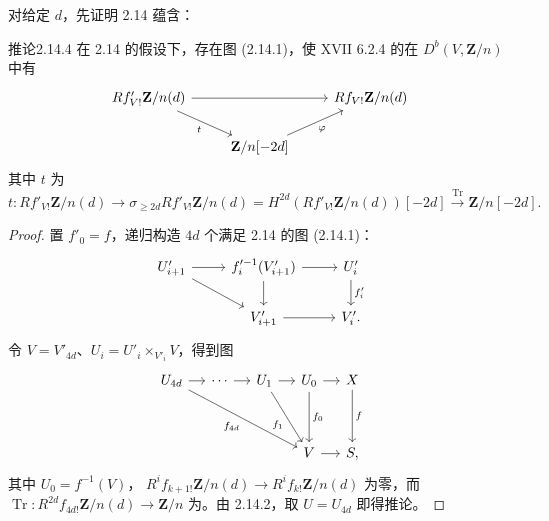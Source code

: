 对给定 $d$，先证明 2.14 蕴含：
\begin{SGAresult}{推论}{2.14.4}
在 2.14 的假设下，存在图 (2.14.1)，使 XVII 6.2.4 的在 $D^b(V,\mathbf Z/n)$ 中有
\[\begin{tikzcd}Rf'_{V!}\mathbf Z/n(d)\arrow[rr]\arrow[dr,"t"']&&Rf_{V!}\mathbf Z/n(d)\\&\mathbf Z/n[-2d]\arrow[ur,"\varphi"']&\end{tikzcd}\]
其中 $t$ 为
\[t:Rf'_{V!}\mathbf Z/n(d)\to\sigma_{\ge2d}Rf'_{V!}\mathbf Z/n(d)=H^{2d}(Rf'_{V!}\mathbf Z/n(d))[-2d]\xrightarrow{\operatorname{Tr}}\mathbf Z/n[-2d].\]
\end{SGAresult}
\begin{proof}
置 $f'_0=f$，递归构造 $4d$ 个满足 2.14 的图 (2.14.1)：
\[\begin{tikzcd}U'_{i+1}\arrow[r]\arrow[dr]&f_i'^{-1}(V'_{i+1})\arrow[r]\arrow[d]&U'_i\arrow[d,"f'_i"]\\&V'_{i+1}\arrow[r]&V'_i.\end{tikzcd}\]
令 $V=V'_{4d}$、$U_i=U'_i\times_{V'_i}V$，得到图
\[\begin{tikzcd}[column sep=small]U_{4d}\arrow[r]\arrow[ddrrr,"f_{4d}"']&\cdots\arrow[r]&U_1\arrow[r]\arrow[ddr,"f_1"']&U_0\arrow[r]\arrow[dd,"f_0"]&X\arrow[dd,"f"]\\\\&&&V\arrow[r]&S,\end{tikzcd}\]
其中 $U_0=f^{-1}(V)$， $R^if_{k+1!}\mathbf Z/n(d)\to R^if_{k!}\mathbf Z/n(d)$ 为零，而 $\operatorname{Tr}:R^{2d}f_{4d!}\mathbf Z/n(d)\to\mathbf Z/n$ 为。由 2.14.2，取 $U=U_{4d}$ 即得推论。
\end{proof}
